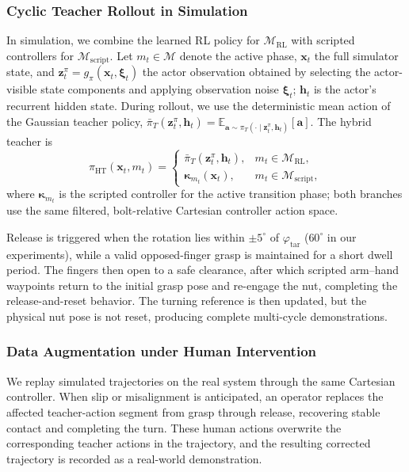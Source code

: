 \subsubsection{Cyclic Teacher Rollout in Simulation}
In simulation, we combine the learned RL policy for
$\mathcal M_{\mathrm{RL}}$ with scripted controllers for
$\mathcal M_{\mathrm{script}}$. Let $m_t\in\mathcal M$ denote the active phase,
$\mathbf{x}_t$ the full simulator state, and
$\mathbf{z}^{\pi}_t=g_{\pi}(\mathbf{x}_t,\boldsymbol\xi_t)$ the actor
observation obtained by selecting the actor-visible state components and
applying observation noise $\boldsymbol\xi_t$; $\mathbf h_t$ is the actor's
recurrent hidden state. During rollout, we use the
deterministic mean action of the Gaussian teacher policy,
$\bar\pi_T(\mathbf{z}^{\pi}_t,\mathbf{h}_t)
=\mathbb E_{\mathbf a\sim\pi_T(\cdot\mid\mathbf{z}^{\pi}_t,\mathbf{h}_t)}
[\mathbf a]$. The hybrid teacher is
\begin{equation}
  \pi_{\mathrm{HT}}(\mathbf{x}_t,m_t)=
  \begin{cases}
    \bar\pi_T(\mathbf{z}^{\pi}_t,\mathbf{h}_t),
      & m_t\in\mathcal M_{\mathrm{RL}},\\
    \boldsymbol\kappa_{m_t}(\mathbf{x}_t),
      & m_t\in\mathcal M_{\mathrm{script}},
  \end{cases}
  \label{eq:hybrid_teacher}
\end{equation}
where $\boldsymbol\kappa_{m_t}$ is the scripted controller for the active
transition phase; both branches use the same filtered, bolt-relative Cartesian
controller action space.

Release is triggered when the rotation lies within $\pm5^\circ$ of
$\varphi_{\mathrm{tar}}$ ($60^\circ$ in our experiments), while a valid
opposed-finger grasp is maintained for a short dwell period. The fingers then
open to a safe clearance, after which scripted arm--hand waypoints return to the
initial grasp pose and re-engage the nut, completing the release-and-reset
behavior. The
turning reference is then updated, but the physical nut pose is not reset,
producing complete multi-cycle demonstrations.

\subsubsection{Data Augmentation under Human Intervention}
We replay simulated trajectories on the real system through the same Cartesian
controller. When slip or misalignment is anticipated, an operator replaces the
affected teacher-action segment from grasp through release, recovering stable
contact and completing the turn. These human actions overwrite the corresponding
teacher actions in the trajectory, and the resulting corrected trajectory is
recorded as a real-world demonstration.

